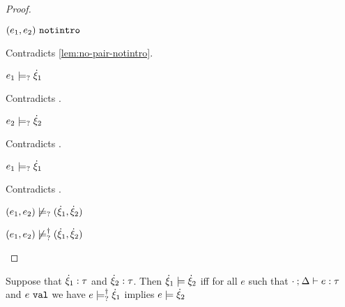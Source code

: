 \begin{proof}
\begin{byCases}
\begin{byCases}
\begin{byCases}
\begin{byCases}
                \begin{pfsteps*}
                \item $(e_1 , e_2) ~\mathtt{notintro}$ 
                \end{pfsteps*}
                Contradicts \autoref{lem:no-pair-notintro}.
            \item[\text{(\ref{rule:CMSPair1})}]
                \begin{pfsteps*}
                \item $e_1 \models_{?} \dot{\xi}_1$ 
                \end{pfsteps*}
                Contradicts .
            \item[\text{(\ref{rule:CMSPair2})}]
                \begin{pfsteps*}
                \item $e_2 \models_{?} \dot{\xi}_2$ 
                \end{pfsteps*}
                Contradicts .
            \item[\text{(\ref{rule:CMSPair3})}]
                \begin{pfsteps*}
                \item $e_1 \models_{?} \dot{\xi}_1$ 
                \end{pfsteps*}
                Contradicts .
            \end{byCases}
            \begin{pfsteps*}
            \item $(e_1 , e_2) \not\models_{?} (\dot{\xi}_1 , \dot{\xi}_2)$  
            \item $(e_1 , e_2) \not\models_{?}^{\dag} (\dot{\xi}_1 , \dot{\xi}_2)$ 
            \end{pfsteps*}
        \end{byCases}
    \end{byCases}
\resetpfcounter
\end{byCases}
\end{proof}

\begin{definition}
  \label{defn:const-entailment}
  Suppose that $\dot{\xi}_1 : \tau$ and $\dot{\xi}_2 : \tau$.
  Then $\dot{\xi}_1 \models \dot{\xi}_2$ iff for all $e$ such that $\cdot \mathbin{;} \Delta \vdash e : \tau$ and $e ~\mathtt{val}$ we have $e \models_{?}^{\dag} \dot{\xi}_1$ implies $e \models \dot{\xi}_2$
\end{definition}

